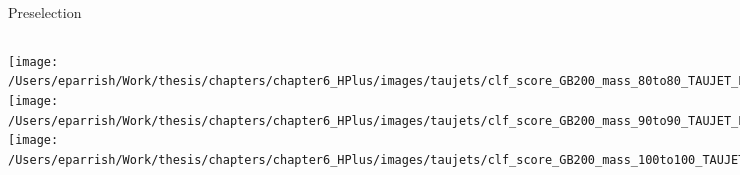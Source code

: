\documentclass[aspectratio=169,xcolor=table]{beamer}
\begin{document}
    \begin{frame}[t]{\taujets Preselection}
      \begin{columns}[t]
          \texttt{[image: /Users/eparrish/Work/thesis/chapters/chapter6\_HPlus/images/taujets/clf\_score\_GB200\_mass\_80to80\_TAUJET\_PRESEL.png]}
          \texttt{[image: /Users/eparrish/Work/thesis/chapters/chapter6\_HPlus/images/taujets/clf\_score\_GB200\_mass\_90to90\_TAUJET\_PRESEL.png]}
          \texttt{[image: /Users/eparrish/Work/thesis/chapters/chapter6\_HPlus/images/taujets/clf\_score\_GB200\_mass\_100to100\_TAUJET\_PRESEL.png]}

          \texttt{[image: /Users/eparrish/Work/thesis/chapters/chapter6\_HPlus/images/taujets/clf\_score\_GB200\_mass\_110to110\_TAUJET\_PRESEL.png]}
          \texttt{[image: /Users/eparrish/Work/thesis/chapters/chapter6\_HPlus/images/taujets/clf\_score\_GB200\_mass\_120to120\_TAUJET\_PRESEL.png]}
          \texttt{[image: /Users/eparrish/Work/thesis/chapters/chapter6\_HPlus/images/taujets/clf\_score\_GB200\_mass\_130to130\_TAUJET\_PRESEL.png]}
          \texttt{[image: /Users/eparrish/Work/thesis/chapters/chapter6\_HPlus/images/taujets/clf\_score\_GB200\_mass\_140to140\_TAUJET\_PRESEL.png]}
          \texttt{[image: /Users/eparrish/Work/thesis/chapters/chapter6\_HPlus/images/taujets/clf\_score\_GB200\_mass\_150to150\_TAUJET\_PRESEL.png]}
          \texttt{[image: /Users/eparrish/Work/thesis/chapters/chapter6\_HPlus/images/taujets/clf\_score\_GB200\_mass\_160to160\_TAUJET\_PRESEL.png]}

          \texttt{[image: /Users/eparrish/Work/thesis/chapters/chapter6\_HPlus/images/taujets/clf\_score\_GB200\_mass\_170to170\_TAUJET\_PRESEL.png]}
          \texttt{[image: /Users/eparrish/Work/thesis/chapters/chapter6\_HPlus/images/taujets/clf\_score\_GB200\_mass\_180to180\_TAUJET\_PRESEL.png]}
          \texttt{[image: /Users/eparrish/Work/thesis/chapters/chapter6\_HPlus/images/taujets/clf\_score\_GB200\_mass\_190to190\_TAUJET\_PRESEL.png]}

      \end{columns}
    \end{frame}
\end{document}
